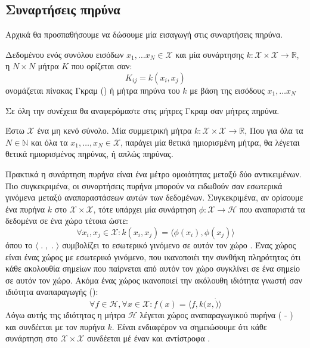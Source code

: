 \subsection{Συναρτήσεις πηρύνα}
Αρχικά θα προσπαθήσουμε να δώσουμε μία εισαγωγή στις συναρτήσεις πηρύνα.
\begin{definition}
Δεδομένου ενός συνόλου εισόδων $x_{1}, \dots x_{N} \in \mathcal{X}$ και μία συνάρτησης $k:\mathcal{X}\times\mathcal{X}\rightarrow \mathbb{R}$, η $N \times N$ μήτρα $K$ που ορίζεται σαν:
$$K_{ij} = k(x_{i}, x_{j}) $$
ονομάζεται πίνακας Γκραμ () ή μήτρα πηρύνα του $k$ με βάση της εισόδους $x_{1}, \dots x_{N}$
\label{def:kernel_matrix}
\end{definition}
Σε όλη την συνέχεια θα αναφερόμαστε στις μήτρες Γκραμ σαν μήτρες πηρύνα.
\begin{definition}
Έστω $\mathcal{X}$ ένα μη κενό σύνολο.
Μία συμμετρική μήτρα $k:\mathcal{X} \times \mathcal{X} \rightarrow \mathbb{R}$, Που για όλα τα $N \in \mathbb{N}$ και όλα τα $x_{1},\dots, x_{N} \in \mathcal{X}$, παράγει μία θετικά ημιορισμένη μήτρα, θα λέγεται θετικά ημιορισμένος πηρύνας, ή απλώς πηρύνας.
\label{def:psd_km}
\end{definition}
Πρακτικά η συνάρτηση πυρήνα είναι ένα μέτρο ομοιότητας μεταξύ δύο αντικειμένων. Πιο συγκεκριμένα, οι συναρτήσεις πυρήνα μπορούν να ειδωθούν σαν εσωτερικά γινόμενα μεταξύ αναπαραστάσεων αυτών των δεδομένων. Συγκεκριμένα, αν ορίσουμε ένα πυρήνα $k$ στο $\mathcal{X}\times\mathcal{X}$, τότε υπάρχει μία συνάρτηση $\phi: \mathcal{X} \rightarrow \mathcal{H}$ που αναπαριστά τα δεδομένα σε ένα χώρο  τέτοια ώστε:
\begin{equation}
\forall x_{i}, x_{j} \in \mathcal{X}: k(x_{i}, x_{j}) = \langle \phi(x_{i}), \phi(x_{j}) \rangle
\end{equation}
όπου το $\langle\;.\;,\;.\;\rangle$ συμβολίζει το εσωτερικό γινόμενο σε αυτόν τον χώρο .
Ένας χώρος  είναι ένας χώρος με εσωτερικό γινόμενο, που ικανοποιέι την συνθήκη πληρότητας ότι κάθε ακολουθία σημείων  που παίρνεται από αυτόν τον χώρο συγκλίνει σε ένα σημείο σε αυτόν τον χώρο. Ακόμα ένας χώρος  ικανοποιεί την ακόλουθη ιδιότητα γνωστή σαν ιδιότητα αναπαραγωγής ():
\begin{equation}
\forall f \in \mathcal{H}, \forall x \in \mathcal{X}: f(x)=\langle f, k(x,\dot)\rangle
\end{equation}
Λόγω αυτής της ιδιότητας η μήτρα $\mathcal{H}$ λέγεται χώρος  αναπαραγωγικού πυρήνα ( - ) και συνδέεται με τον πυρήνα $k$.
Είναι ενδιαφέρον να σημειώσουμε ότι κάθε συνάρτηση στο $\mathcal{X} \times \mathcal{X}$ συνδέεται μέ έναν  και αντίστροφα \cite{Aronszajn1950}.

